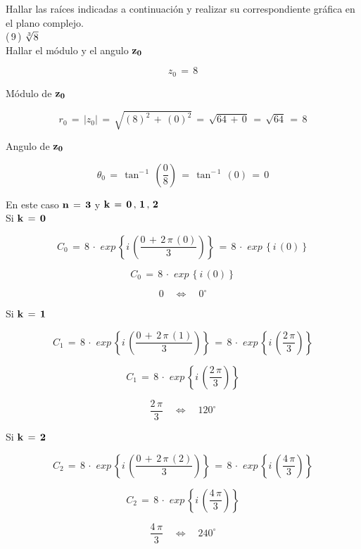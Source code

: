 \documentclass[a4paper,11pt,openany]{book}
\begin{document}
Hallar las raíces indicadas a continuación y realizar su correspondiente gráfica en el plano complejo.\\

\textcolor{ao(english)}{(\,9\,)} $\bf{\sqrt[3]{8}}$\\

\textcolor{ao(english)}{} Hallar el módulo y el angulo $\bf{z_{0}}$

$$z_{0}\,=\,8$$

\textcolor{ao(english)}{} Módulo de $\bf{z_{0}}$

$$r_{0}\,=\,|z_{0}|\,=\,\sqrt{\left(8\right)^{2}\,+\,\left(0\right)^{2}}\,=\,\sqrt{64\,+\,0}\,=\,\sqrt{64}\,=\,8$$

\textcolor{ao(english)}{} Angulo de $\bf{z_{0}}$

$$\theta_{0}\,=\,\tan^{-\,1}\,\left(\dfrac{0}{8}\right)\,=\,\tan^{-\,1}\,\left(0\right)\,=\,0$$

\textcolor{ao(english)}{} En este caso $\bf{n\,=\,3}$ y $\bf{k\,=\,0\,,\,1\,,\,2}$\\

\textcolor{ao(english)}{} Si $\bf{k\,=\,0}$

$$C_{0}\,=\,8\,\cdot\,\,exp\,\left\{i\,\left(\dfrac{0\,+\,2\,\pi\,(0)}{3}\right)\right\}\,=\,8\,\cdot\,\,exp\,\left\{i\,\left(0\right)\right\}$$

$$C_{0}\,=\,8\,\cdot\,\,exp\,\left\{i\,\left(0\right)\right\}$$

$$0 \quad\iff\quad 0^\circ$$

\textcolor{ao(english)}{} Si $\bf{k\,=\,1}$

$$C_{1}\,=\,8\,\cdot\,\,exp\,\left\{i\,\left(\dfrac{0\,+\,2\,\pi\,(1)}{3}\right)\right\}\,=\,8\,\cdot\,\,exp\,\left\{i\,\left(\frac{2\,\pi}{3}\right)\right\}$$

$$C_{1}\,=\,8\,\cdot\,\,exp\,\left\{i\,\left(\frac{2\,\pi}{3}\right)\right\}$$

$$\frac{2\,\pi}{3} \quad\iff\quad 120^\circ$$

\textcolor{ao(english)}{} Si $\bf{k\,=\,2}$

$$C_{2}\,=\,8\,\cdot\,\,exp\,\left\{i\,\left(\dfrac{0\,+\,2\,\pi\,(2)}{3}\right)\right\}\,=\,8\,\cdot\,\,exp\,\left\{i\,\left(\frac{4\,\pi}{3}\right)\right\}$$

$$C_{2}\,=\,8\,\cdot\,\,exp\,\left\{i\,\left(\frac{4\,\pi}{3}\right)\right\}$$

$$\frac{4\,\pi}{3} \quad\iff\quad 240^\circ$$
\end{document}
